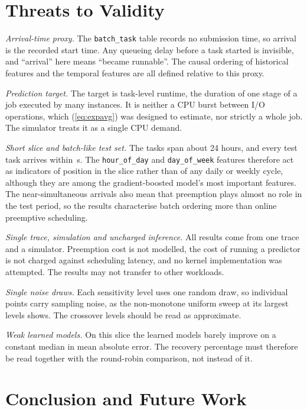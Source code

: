 \documentclass[conference]{IEEEtran}
\begin{document}
\section{Threats to Validity}
\label{sec:threats}

\emph{Arrival-time proxy.} The \texttt{batch\_task} table records no
submission time, so arrival is the recorded start time. Any queueing delay
before a task started is invisible, and ``arrival'' here means ``became
runnable''. The causal ordering of historical features and the temporal
features are all defined relative to this proxy.

\emph{Prediction target.} The target is task-level runtime, the duration of
one stage of a job executed by many instances. It is neither a CPU burst
between I/O operations, which (\ref{eq:expavg}) was designed to estimate,
nor strictly a whole job. The simulator treats it as a single CPU demand.

\emph{Short slice and batch-like test set.} The \nTasks{} tasks span about
24 hours, and every test task arrives within \testWindow{}\,s. The
\texttt{hour\_of\_day} and \texttt{day\_of\_week} features therefore act as
indicators of position in the slice rather than of any daily or weekly
cycle, although they are among the gradient-boosted model's most important
features. The near-simultaneous arrivals also mean that preemption plays
almost no role in the test period, so the results characterise batch
ordering more than online preemptive scheduling.

\emph{Single trace, simulation and uncharged inference.} All results come
from one trace and a simulator. Preemption cost is not modelled, the cost of
running a predictor is not charged against scheduling latency, and no
kernel implementation was attempted. The results may not transfer to other
workloads.

\emph{Single noise draws.} Each sensitivity level uses one random draw, so
individual points carry sampling noise, as the non-monotone uniform sweep at
its largest levels shows. The crossover levels should be read as
approximate.

\emph{Weak learned models.} On this slice the learned models barely improve
on a constant median in mean absolute error. The recovery percentage must
therefore be read together with the round-robin comparison, not instead of
it.

\section{Conclusion and Future Work}
\label{sec:conclusion}
\end{document}
